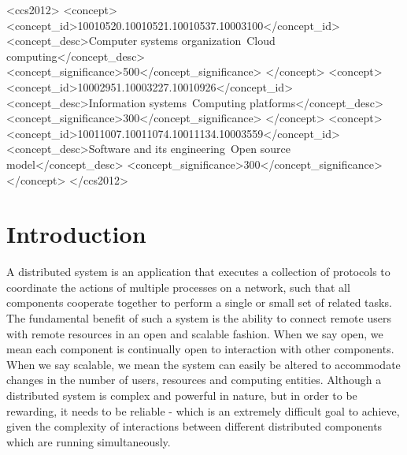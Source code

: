 \documentclass[sigconf]{acmart}
\begin{document}
%
%
\begin{CCSXML}
<ccs2012>
<concept>
<concept_id>10010520.10010521.10010537.10003100</concept_id>
<concept_desc>Computer systems organization~Cloud computing</concept_desc>
<concept_significance>500</concept_significance>
</concept>
<concept>
<concept_id>10002951.10003227.10010926</concept_id>
<concept_desc>Information systems~Computing platforms</concept_desc>
<concept_significance>300</concept_significance>
</concept>
<concept>
<concept_id>10011007.10011074.10011134.10003559</concept_id>
<concept_desc>Software and its engineering~Open source model</concept_desc>
<concept_significance>300</concept_significance>
</concept>
</ccs2012>
\end{CCSXML}



\maketitle

\section{Introduction}

A distributed system is an application that executes a collection of protocols to coordinate the actions of multiple processes on a network, such that all components cooperate together to perform a single or small set of related tasks. The fundamental benefit of such a system is the ability to connect remote users with remote resources in an open and scalable fashion. When we say open, we mean each component is continually open to interaction with other components. When we say scalable, we mean the system can easily be altered to accommodate changes in the number of users, resources and computing entities. Although a distributed system is complex and powerful in nature, but in order to be rewarding, it needs to be reliable - which is an extremely difficult goal to achieve, given the complexity of interactions between different distributed components which are running simultaneously. 
\end{document}
